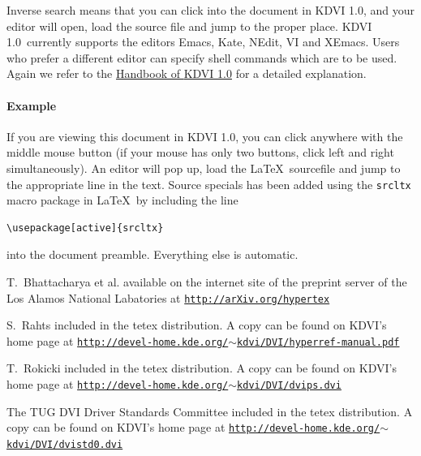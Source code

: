 \documentclass{article}
\newcommand{\KDVI}{{\sf KDVI 1.0}}
\begin{document}
Inverse search means that you can click into the document in \KDVI,
and your editor will open, load the source file and jump to the proper
place. \KDVI\ currently supports the editors Emacs, Kate, NEdit, VI
and XEmacs. Users who prefer a different editor can specify shell
commands which are to be used. Again we refer to the
\href{help:/kdvi/inverse-search.html}{Handbook of \KDVI} for a detailed explanation.

\paragraph*{Example}
If you are viewing this document in \KDVI, you can click anywhere with
the middle mouse button (if your mouse has only two buttons, click
left and right simultaneously). An editor will pop up, load the
\LaTeX\ sourcefile and jump to the appropriate line in the
text. Source specials has been added using the {\tt srcltx} macro
package in \LaTeX\ by including the line
\begin{verbatim}
\usepackage[active]{srcltx}
\end{verbatim}
into the document preamble. Everything else is automatic.


\begin{thebibliography}{CM97}

T.~Bhattacharya et al.
\newblock available on the internet site of the preprint server of the
 Los Alamos National Labatories at 
\href{http://arXiv.org/hypertex}{\small \tt http://arXiv.org/hypertex}

S.~Rahts
\newblock included in the tetex distribution. A copy can be found on KDVI's 
home page at \hfill \linebreak
\href{http://devel-home.kde.org/~kdvi/DVI/hyperref-manual.pdf}{\small \tt http://devel-home.kde.org/$\sim$kdvi/DVI/hyperref-manual.pdf}

T.~Rokicki
\newblock included in the tetex distribution. A copy can be found on KDVI's 
home page at \hfill \linebreak
\href{http://devel-home.kde.org/~kdvi/DVI/dvips.dvi}{\small \tt http://devel-home.kde.org/$\sim$kdvi/DVI/dvips.dvi}

The TUG DVI Driver Standards Committee
\newblock included in the tetex distribution. A copy can be found on KDVI's 
home page at \hfill \linebreak
\href{http://devel-home.kde.org/~kdvi/DVI/dvistd0.dvi}{\small \tt http://devel-home.kde.org/$\sim$kdvi/DVI/dvistd0.dvi}


\end{thebibliography}
\end{document}
